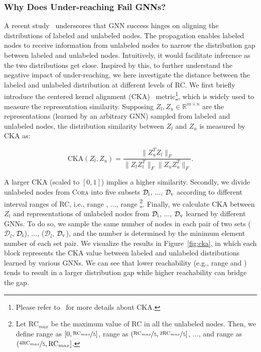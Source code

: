 \documentclass[letterpaper]{article} %
\newcommand{\labeledset}{\mathcal{D}_{l}}
\newcommand{\testset}[1]{$\mathcal{D}_{\text{\uppercase\expandafter{\romannumeral#1}}}$}
\newcommand{\roma}[1]{\uppercase\expandafter{\romannumeral#1}}
\begin{document}
 \subsubsection{Why Does Under-reaching Fail GNNs?}
 A recent study~\cite{distribution} underscores that GNN success hinges on aligning the distributions of labeled and unlabeled nodes. The propagation enables labeled nodes to receive information from unlabeled nodes to narrow the distribution gap between labeled and unlabeled nodes. Intuitively, it would facilitate inference as the two distributions get close. Inspired by this, to further understand the negative impact of under-reaching, we here investigate the distance between the labeled and unlabeled distribution at different levels of RC. We first briefly introduce the centered kernel alignment (CKA)~\cite{cka} metric\footnote{Please refer to~\cite{cka, distribution} for more details about CKA.}, which is widely used to measure the representation similarity. Supposing $Z_{l}, Z_{u} \in \mathbb{R}^{m \times n}$ are the representations (learned by an arbitrary GNN) sampled from labeled and unlabeled nodes, the distribution similarity between $Z_{l}$ and $Z_{u}$ is measured by CKA as:
 \begin{small}
 	 \begin{equation}
 	\text{CKA}(Z_{l}, Z_{u}) = \frac{\lVert Z_{u}^{T}Z_{l}\rVert_{F}}{\lVert Z_{l}Z_{l}^{T} \rVert_{F} \lVert Z_{u}Z_{u}^{T} \rVert_{F}}.
 \end{equation}
 \end{small}A larger CKA (scaled to $[0,1]$) implies a higher similarity. Secondly, we divide unlabeled nodes from \textsc{Cora} into five subsets \testset{1}, ..., \testset{5} according to different interval ranges of RC, i.e., range \roma{1}, ..., range \roma{5}\footnote{Let RC$_{max}$ be the maximum value of RC in all the unlabeled nodes. Then, we define range \roma{1} as $[0, \nicefrac{\text{RC}_{max}}{5}]$, range \roma{2} as $(\nicefrac{\text{RC}_{max}}{5}, \nicefrac{2\text{RC}_{max}}{5}]$, ..., and range \roma{5} as $(\nicefrac{4\text{RC}_{max}}{5}, \text{RC}_{max}]$.}. Finally, we calculate CKA between $Z_{l}$ and representations of unlabeled nodes from \testset{1}, ..., \testset{5} learned by different GNNs. To do so, we sample the same number of nodes in each pair of two sets ($\labeledset$, \testset{1}), ..., ($\labeledset$, \testset{5}), and the number is determined by the minimum element number of each set pair. We visualize the results in Figure~\ref{fig:cka}, in which each block represents the CKA value between labeled and unlabeled distributions learned by various GNNs. We can see that lower reachability (e.g., range \roma{1} and \roma{2}) tends to result in a larger distribution gap while higher reachability can bridge the gap.
\end{document}
